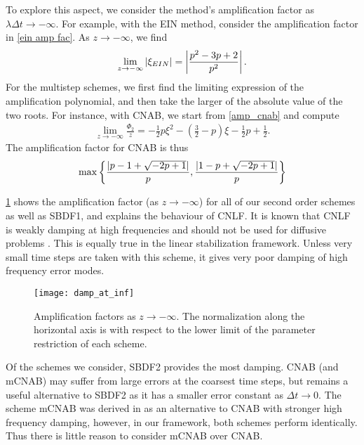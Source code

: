 To explore this aspect, we consider the method's amplification factor as $\lambda\Delta t \to -\infty$. For example, with the EIN method, consider the amplification factor in \cref{ein amp fac}. As $z\to -\infty$, we find 
\begin{align}
        \lim_{z\to-\infty} \left|\xi_{EIN}\right| = \left|\frac{p^2-3p+2}{p^2}\right|.
\end{align}
For the multistep schemes, we first find the limiting expression of the amplification polynomial, and then take the larger of the absolute value of the two roots. For instance, with CNAB, we start from \cref{amp_cnab} and compute
\begin{align}
        \lim_{z\to-\infty} \frac{\Phi_2}{z}
= -\frac{1}{2}p\xi^2-\left(\frac{3}{2}-p\right)\xi-\frac{1}{2}p+\frac{1}{2}.
\end{align}
The amplification factor for CNAB is thus 
\begin{align}
\max\left\{ \frac{\left|p-1+\sqrt{-2p+1}\right|}{p}, \frac{\left|1-p+\sqrt{-2p+1}\right|}{p}\right\}
\end{align}

\cref{fig:damp fac at inf} shows the amplification factor (as $z\to-\infty$) for all of our second order schemes as well as SBDF1, and explains the behaviour of CNLF. It is known that CNLF is weakly damping at high frequencies and should not be used for diffusive problems \cite{ascher1995implicit}. This is equally true in the linear stabilization framework. Unless very small time steps are taken with this scheme, it gives very poor damping of high frequency error modes.

\begin{figure}[htb!]
	\centering 
\texttt{[image: damp\_at\_inf]}
\caption[Amplification factors as $z\to-\infty$]{Amplification factors as $z\to-\infty$. The normalization along the horizontal axis is with respect to the lower limit of the parameter restriction of each scheme.}
\label{fig:damp fac at inf}
\end{figure}

Of the schemes we consider, SBDF2 provides the most damping. CNAB (and mCNAB) may suffer from large errors at the coarsest time steps, but remains a useful alternative to SBDF2 as it has a smaller error constant as $\Delta t\to 0$. The scheme mCNAB was derived in \cite{ascher1995implicit} as an alternative to CNAB with stronger high frequency damping, however, in our framework, both schemes perform identically. Thus there is little reason to consider mCNAB over CNAB.

